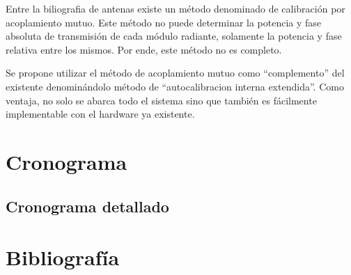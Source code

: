 \documentclass[a4paper,10pt]{article}
\begin{document}
Entre la biliografia de antenas existe un método denominado de calibración por 
acoplamiento mutuo. Este método no puede
determinar la potencia y fase absoluta de transmisión de cada módulo radiante, 
solamente la potencia y fase relativa entre los mismos. Por ende, este método no
es completo.

Se propone utilizar el método de acoplamiento mutuo como “complemento” del 
existente denominándolo método de “autocalibracion interna extendida”. Como 
ventaja, no solo se abarca todo el sistema sino que también es fácilmente 
implementable con el hardware ya existente. 

	\section{Cronograma}
	\subsection{Cronograma detallado}

	\newpage
	\section{Bibliografía}
	
\end{document}
